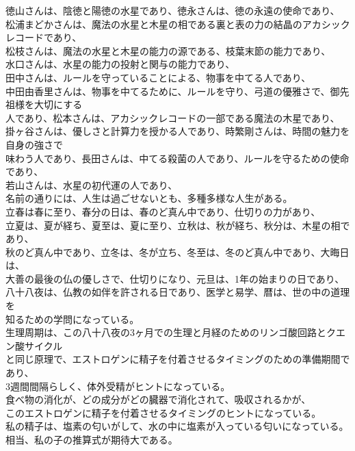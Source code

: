 \documentclass{jsarticle}
\begin{document}
徳山さんは、陰徳と陽徳の水星であり、徳永さんは、徳の永遠の使命であり、\\
松浦まどかさんは、魔法の水星と木星の相である裏と表の力の結晶のアカシックレコードであり、\\
松枝さんは、魔法の水星と木星の能力の源である、枝葉末節の能力であり、\\
水口さんは、水星の能力の投射と関与の能力であり、\\
田中さんは、ルールを守っていることによる、物事を中てる人であり、\\
中田由香里さんは、物事を中てるために、ルールを守り、弓道の優雅さで、御先祖様を大切にする\\
人であり、松本さんは、アカシックレコードの一部である魔法の木星であり、\\
掛ヶ谷さんは、優しさと計算力を授かる人であり、時繁剛さんは、時間の魅力を自身の強さで\\
味わう人であり、長田さんは、中てる殺菌の人であり、ルールを守るための使命であり、\\
若山さんは、水星の初代運の人であり、\\
名前の通りには、人生は過ごせないとも、多種多様な人生がある。\\
立春は春に至り、春分の日は、春のど真ん中であり、仕切りの力があり、\\
立夏は、夏が経ち、夏至は、夏に至り、立秋は、秋が経ち、秋分は、木星の相であり、\\
秋のど真ん中であり、立冬は、冬が立ち、冬至は、冬のど真ん中であり、大晦日は、\\
大善の最後の仏の優しさで、仕切りになり、元旦は、1年の始まりの日であり、\\
八十八夜は、仏教の如伴を許される日であり、医学と易学、暦は、世の中の道理を\\
知るための学問になっている。 \\
生理周期は、この八十八夜の3ヶ月での生理と月経のためのリンゴ酸回路とクエン酸サイクル\\
と同じ原理で、エストロゲンに精子を付着させるタイミングのための準備期間であり、\\
3週間間隔らしく、体外受精がヒントになっている。\\
食べ物の消化が、どの成分がどの臓器で消化されて、吸収されるかが、\\
このエストロゲンに精子を付着させるタイミングのヒントになっている。\\
私の精子は、塩素の匂いがして、水の中に塩素が入っている匂いになっている。\\
相当、私の子の推算式が期待大である。\\
\end{document}
